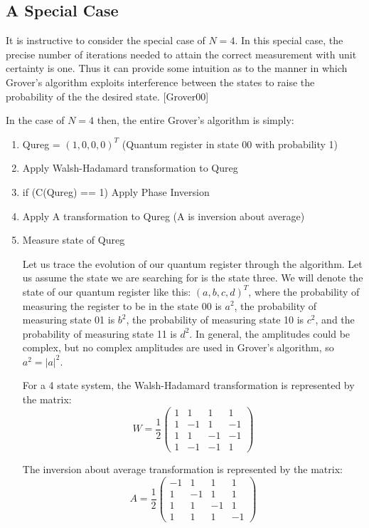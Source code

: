 \documentclass[]{article}
\begin{document}
\subsection{A Special Case}

It is instructive to consider the special case of $N = 4$.  In this
special case, the precise number of iterations needed to attain the
correct measurement with unit certainty is one.  Thus it can provide
some intuition as to the manner in which Grover's algorithm exploits
interference between the states to raise the probability of the the
desired state. [Grover00]

In the case of $N = 4$ then, the entire Grover's algorithm is simply:
\begin{enumerate}
\item Qureg = $(1,0,0,0)^{T}$ (Quantum register in state 00 with probability 1)
\item Apply Walsh-Hadamard transformation to Qureg
\item if (C(Qureg) == 1) Apply Phase Inversion
\item Apply A transformation to Qureg (A is inversion about average)
\item Measure state of Qureg

Let us trace the evolution of our quantum register through the
algorithm.  Let us assume the state we are searching for is the state
three.  We will denote the state of our quantum register like this:
$(a,b,c,d)^{T}$, where the probability of measuring the register to be
in the state 00 is $a^{2}$, the probability of measuring state 01 is
$b^{2}$, the probability of measuring state 10 is $c^{2}$, and the
probability of measuring state 11 is $d^{2}$.  In general, the
amplitudes could be complex, but no complex amplitudes are used in
Grover's algorithm, so $a^{2} = |a|^{2}$.

For a 4 state system, the Walsh-Hadamard transformation is represented
by the matrix:
	\[W = \frac{1}{2}\left(\begin{array}{cccc}
	1 & 1 & 1 & 1 \\
	1 & -1 & 1 & -1 \\
	1 & 1 & -1 & -1 \\
	1 & -1 & -1 & 1 
	\end{array}\right)\]	

The inversion about average transformation is represented by the
matrix:
	\[A = \frac{1}{2}\left(\begin{array}{cccc}
	-1 & 1 & 1 & 1 \\
	1 & -1 & 1 & 1 \\
	1 & 1 & -1 & 1 \\
	1 & 1 & 1 & -1 
	\end{array}\right)\]	
\end{enumerate}
\end{document}
